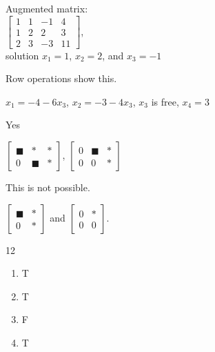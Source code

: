 \begin{multicols}{2}
\obe
\item Augmented matrix: \\
$\left[ \begin{array}{ccr|c} 1&1&-1&4 \\ 1&2&2&3 \\ 2&3&-3&11 \end{array} \right]$, \\
solution $x_1 = 1$, $x_2=2$, and $x_3 = -1$ 

\item Row operations show this. 

\item $x_1 = -4-6x_3$, $x_2 = -3-4x_3$, $x_3$ is free, $x_4 = 3$

\item 
\ba
\item Yes

\item $\left[ \begin{array}{cc|c} \blacksquare&*&* \\ 0&\blacksquare&* \end{array} \right]$, $\left[ \begin{array}{cc|c} 0&\blacksquare&* \\ 0&0&* \end{array} \right]$

\ea

\item This is not possible.


\item $\left[ \begin{array}{cc} \blacksquare&*\\0&* \end{array} \right]$ and $\left[ \begin{array}{cc} 0&*\\0&0 \end{array} \right]$.

\oee

\be
\item[12]
\begin{enumerate}[label=(\alph*), leftmargin=1\parindent]
	\item T

	\item T

	\item  F


	\item T


\end{enumerate}
\end{multicols}
